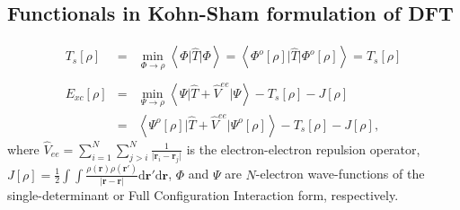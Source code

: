 \documentclass[amsmath,amssymb,preprint,aip,jcp]{revtex4-1}
\begin{document}
\subsection{Functionals in Kohn-Sham formulation of DFT}
\begin{eqnarray}
T_s[\rho]&=&
\min_{\Phi\longrightarrow \rho}\left<\Phi\vert \hat{T}\vert \Phi\right>
= \left<\Phi^{o}[\rho]\vert \hat{T} \vert \Phi^{o}[\rho]\right>=T_s[\rho]\\
\nonumber\\
E_{xc}[\rho]&=& \label{eq:def_xc}
\min_{\Psi\longrightarrow \rho}\left<\Psi\vert \hat{T}+\hat{V}^{ee}\vert \Psi\right>- T_s[\rho]-J[\rho] \\ &=& \left<\Psi^{o}[\rho]\vert \hat{T}+\hat{V}^{ee} \vert \Psi^{o}[\rho]\right>-T_s[\rho]-J[\rho], \nonumber %
\end{eqnarray}
where 
$\hat{V}_{ee}=\sum_{i=1}^{N}\sum_{j>i}^{N}\frac{1}{\vert\mathbf{r}_i-\mathbf{r}_j\vert}$ 
is the electron-electron repulsion operator,  
$J[\rho]=\frac{1}{2}
\int \int 
\frac
{\rho(\mathbf{r})\rho(\mathbf{r}')}
{
\left|\mathbf{r}-\mathbf{r}\right|}
\mathrm{d}\mathbf{r}'
\mathrm{d}\mathbf{r}
$, $\Phi$ and $\Psi$ are  $N$-electron wave-functions of the single-determinant or Full Configuration Interaction form, respectively.
\end{document}
